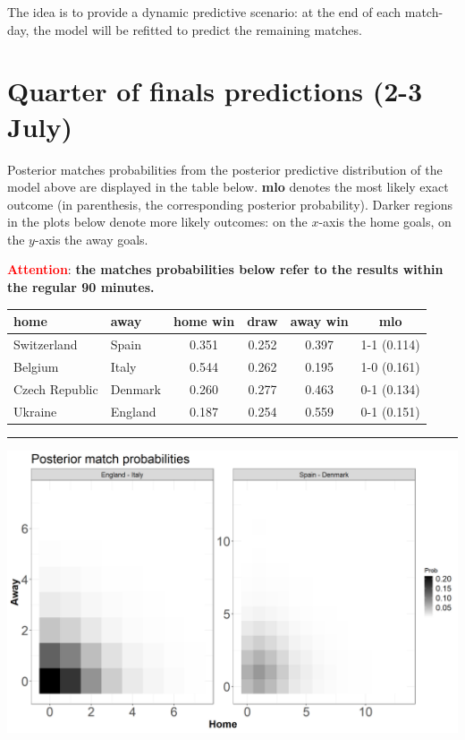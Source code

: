 \documentclass[10pt,]{article}
\begin{document}
The idea is to provide a dynamic predictive scenario: at the end of each
match-day, the model will be refitted to predict the remaining matches.

\section{Quarter of finals predictions (2-3
July)}\label{groupstage-predictions-quarter-of-finals-2-3-july}

Posterior matches probabilities from the posterior predictive
distribution of the model above are displayed in the table below.
\textbf{mlo} denotes the most likely exact outcome (in parenthesis, the
corresponding posterior probability). Darker regions in the plots below
denote more likely outcomes: on the \(x\)-axis the home goals, on the
\(y\)-axis the away goals.

\textcolor{red}{\textbf{Attention}}: \textbf{the matches probabilities below refer to the results
within the regular 90 minutes.}

\begin{longtable}[]{@{}llcccc@{}}
\toprule
home & away & home win & draw & away win & mlo\tabularnewline
\midrule
\endhead
Switzerland & Spain & 0.351 & 0.252 & 0.397 & 1-1 (0.114)\tabularnewline
Belgium & Italy & 0.544 & 0.262 & 0.195 & 1-0 (0.161)\tabularnewline
Czech Republic & Denmark & 0.260 & 0.277 & 0.463 & 0-1
(0.134)\tabularnewline
Ukraine & England & 0.187 & 0.254 & 0.559 & 0-1 (0.151)\tabularnewline
\bottomrule
\end{longtable}

\begin{center}\rule{0.5\linewidth}{0.5pt}\end{center}

\begin{center}\includegraphics[width=0.8\linewidth]{figs/data2-1} \end{center}
\end{document}

